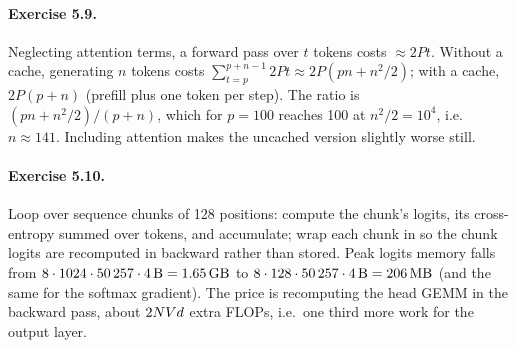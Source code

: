 \paragraph{Exercise 5.9.}
Neglecting attention terms, a forward pass over $t$ tokens costs $\approx2Pt$. Without a cache,
generating $n$ tokens costs $\sum_{t=p}^{p+n-1}2Pt\approx2P(pn+n^2/2)$; with a cache, $2P(p+n)$
(prefill plus one token per step). The ratio is $(pn+n^2/2)/(p+n)$, which for $p=100$ reaches 100 at
$n^2/2=10^4$, i.e.\ $n\approx141$. Including attention makes the uncached version slightly worse still.

\paragraph{Exercise 5.10.}
Loop over sequence chunks of 128 positions: compute the chunk's logits, its cross-entropy summed over
tokens, and accumulate; wrap each chunk in  so the chunk logits are
recomputed in backward rather than stored. Peak logits memory falls from
$8\cdot1024\cdot\num{50257}\cdot4\,\text{B}=\SI{1.65}{\giga\byte}$ to
$8\cdot128\cdot\num{50257}\cdot4\,\text{B}=\SI{206}{\mega\byte}$ (and the same for the softmax
gradient). The price is recomputing the head GEMM in the backward pass, about $2NV d$ extra
FLOPs, i.e.\ one third more work for the output layer.

